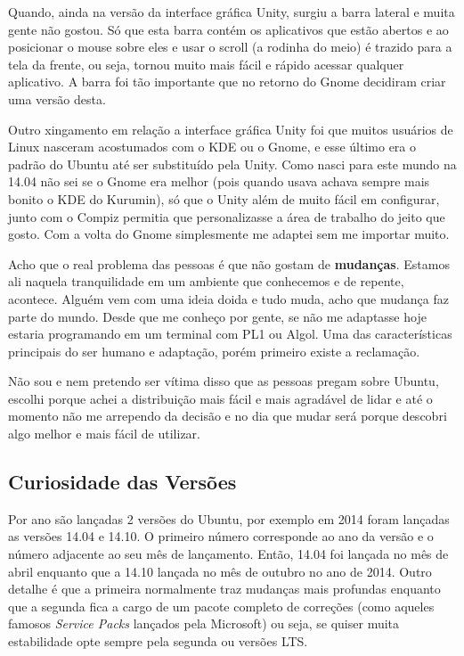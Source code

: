Quando, ainda na versão da interface gráfica Unity, surgiu a barra lateral e muita gente não gostou. Só que esta barra contém os aplicativos que estão abertos e ao posicionar o mouse sobre eles e usar o scroll (a rodinha do meio) é trazido para a tela da frente, ou seja, tornou muito mais fácil e rápido acessar qualquer aplicativo. A barra foi tão importante que no retorno do Gnome decidiram criar uma versão desta.

Outro xingamento em relação a interface gráfica Unity foi que muitos usuários de Linux nasceram acostumados com o KDE ou o Gnome, e esse último era o padrão do Ubuntu até ser substituído pela Unity. Como nasci para este mundo na 14.04 não sei se o Gnome era melhor (pois quando usava achava sempre mais bonito o KDE do Kurumin), só que o Unity além de muito fácil em configurar, junto com o Compiz permitia que personalizasse a área de trabalho do jeito que gosto. Com a volta do Gnome simplesmente me adaptei sem me importar muito.

Acho que o real problema das pessoas é que não gostam de \textbf{mudanças}. Estamos ali naquela tranquilidade em um ambiente que conhecemos e de repente, acontece. Alguém vem com uma ideia doida e tudo muda, acho que mudança faz parte do mundo. Desde que me conheço por gente, se não me adaptasse hoje estaria programando em um terminal com PL1 ou Algol. Uma das características principais do ser humano e adaptação, porém primeiro existe a reclamação. 

Não sou e nem pretendo ser vítima disso que as pessoas pregam sobre Ubuntu, escolhi porque achei a distribuição mais fácil e mais agradável de lidar e até o momento não me arrependo da decisão e no dia que mudar será porque descobri algo melhor e mais fácil de utilizar.

\subsection{Curiosidade das Versões}
Por ano são lançadas 2 versões do Ubuntu, por exemplo em 2014 foram lançadas as versões 14.04 e 14.10. O primeiro número corresponde ao ano da versão e o número adjacente ao seu mês de lançamento. Então, 14.04 foi lançada no mês de abril enquanto que a 14.10 lançada no mês de outubro no ano de 2014. Outro detalhe é que a primeira normalmente traz mudanças mais profundas enquanto que a segunda fica a cargo de um pacote completo de correções (como aqueles famosos \textit{Service Packs} lançados pela Microsoft) ou seja, se quiser muita estabilidade opte sempre pela segunda ou versões LTS.

